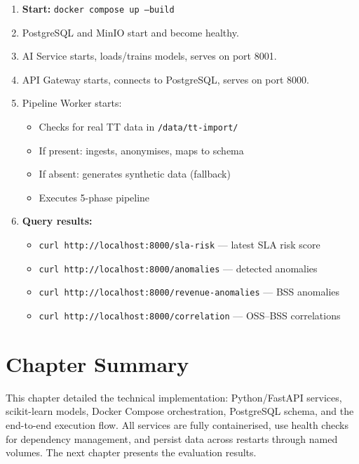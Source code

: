 \begin{enumerate}
  \item \textbf{Start:} \texttt{docker compose up --build}
  \item PostgreSQL and MinIO start and become healthy.
  \item AI Service starts, loads/trains models, serves on port 8001.
  \item API Gateway starts, connects to PostgreSQL, serves on port 8000.
  \item Pipeline Worker starts:
  \begin{itemize}
    \item Checks for real TT data in \texttt{/data/tt-import/}
    \item If present: ingests, anonymises, maps to schema
    \item If absent: generates synthetic data (fallback)
    \item Executes 5-phase pipeline
  \end{itemize}
  \item \textbf{Query results:}
  \begin{itemize}
    \item \texttt{curl http://localhost:8000/sla-risk} --- latest SLA risk score
    \item \texttt{curl http://localhost:8000/anomalies} --- detected anomalies
    \item \texttt{curl http://localhost:8000/revenue-anomalies} --- BSS anomalies
    \item \texttt{curl http://localhost:8000/correlation} --- OSS--BSS correlations
  \end{itemize}
\end{enumerate}

\section{Chapter Summary}

This chapter detailed the technical implementation: Python/FastAPI services, scikit-learn models, Docker Compose orchestration, PostgreSQL schema, and the end-to-end execution flow. All services are fully containerised, use health checks for dependency management, and persist data across restarts through named volumes. The next chapter presents the evaluation results.
